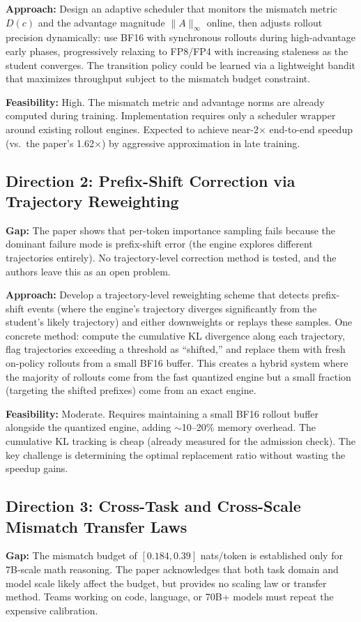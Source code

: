 \documentclass[11pt,a4paper]{article}
\begin{document}
\textbf{Approach:} Design an adaptive scheduler that monitors the mismatch metric $D(c)$ and the advantage magnitude $\|A\|_\infty$ online, then adjusts rollout precision dynamically: use BF16 with synchronous rollouts during high-advantage early phases, progressively relaxing to FP8/FP4 with increasing staleness as the student converges. The transition policy could be learned via a lightweight bandit that maximizes throughput subject to the mismatch budget constraint.

\textbf{Feasibility:} High. The mismatch metric and advantage norms are already computed during training. Implementation requires only a scheduler wrapper around existing rollout engines. Expected to achieve near-2$\times$ end-to-end speedup (vs.\ the paper's 1.62$\times$) by aggressive approximation in late training.

\subsection{Direction 2: Prefix-Shift Correction via Trajectory Reweighting}
\textbf{Gap:} The paper shows that per-token importance sampling fails because the dominant failure mode is prefix-shift error (the engine explores different trajectories entirely). No trajectory-level correction method is tested, and the authors leave this as an open problem.

\textbf{Approach:} Develop a trajectory-level reweighting scheme that detects prefix-shift events (where the engine's trajectory diverges significantly from the student's likely trajectory) and either downweights or replays these samples. One concrete method: compute the cumulative KL divergence along each trajectory, flag trajectories exceeding a threshold as ``shifted,'' and replace them with fresh on-policy rollouts from a small BF16 buffer. This creates a hybrid system where the majority of rollouts come from the fast quantized engine but a small fraction (targeting the shifted prefixes) come from an exact engine.

\textbf{Feasibility:} Moderate. Requires maintaining a small BF16 rollout buffer alongside the quantized engine, adding $\sim$10--20\% memory overhead. The cumulative KL tracking is cheap (already measured for the admission check). The key challenge is determining the optimal replacement ratio without wasting the speedup gains.

\subsection{Direction 3: Cross-Task and Cross-Scale Mismatch Transfer Laws}
\textbf{Gap:} The mismatch budget of $[0.184, 0.39]$ nats/token is established only for 7B-scale math reasoning. The paper acknowledges that both task domain and model scale likely affect the budget, but provides no scaling law or transfer method. Teams working on code, language, or 70B+ models must repeat the expensive calibration.
\end{document}
